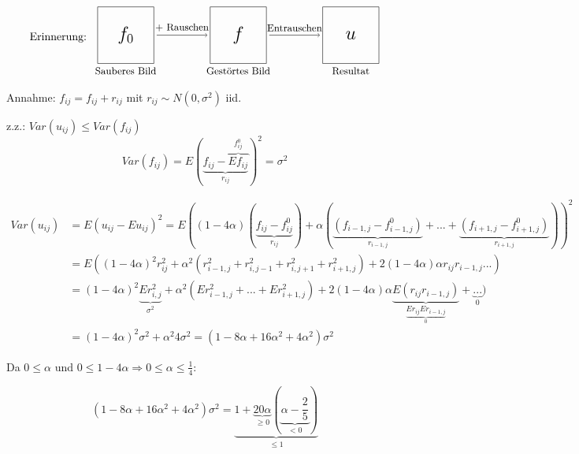 			\begin{equation*}
					\text{Erinnerung: } \raisebox{-1.2cm}{\begin{tikzpicture}[scale=0.9]
						\draw (0,0) rectangle (2,2);
						\draw (1,0) node[below] {\small Sauberes Bild};
						\draw (1,1) node[] {\LARGE $f_0$};
						\draw[->] (2.1,1) -- node[above] {\small $+$ Rauschen} (3.9,1);
						\draw (4,0) rectangle (6,2);
						\draw (5,0) node[below] {\small Gestörtes Bild};
						\draw (5,1) node[] {\LARGE $f$};
						\draw[->] (6.1,1) -- node[above] {\small Entrauschen} (7.9,1);
						\draw (8,0) rectangle (10,2);				
						\draw (9,0) node[below] {\small Resultat};
						\draw (9,1) node[] {\LARGE $u$};
					\end{tikzpicture}}
			\end{equation*}
		
			Annahme: $f_{ij} = f_{ij} +r_{ij}$ mit $r_{ij} \sim N(0,\sigma^2)$ iid.
		
			z.z.: $Var(u_{ij}) \leq Var(f_{ij})$\\
			
			\begin{equation*}
				Var(f_{ij}) = E(\underbrace{f_{ij} - \overbrace{E f_{ij}}^{f^0_{ij}}}%
					_{r_{ij}})^2 = \sigma^2
			\end{equation*}
		
			\todoLayout
			\begin{align*}
				Var(u_{ij}) &= E(u_{ij} - E u_{ij})^2 = E((1 - 4 \alpha) (\underbrace{f_{ij} - f^0_{ij}}_{r_{ij}}) + \alpha(\underbrace{(f_{i-1,j} - f^0_{i-1,j})}_{r_{i-1,j}} + ... + \underbrace{(f_{i+1,j} - f^0_{i+1,j})}_{r_{i+1,j}}))^2\\
				&= E((1 - 4 \alpha)^2 r_{ij}^2 + \alpha^2(r_{i-1,j}^2 + r_{i,j-1}^2 +r_{i,j+1}^2 + r_{i+1,j}^2) + 2 (1 - 4 \alpha) \alpha r_{ij} r_{i-1,j}...)\\
				&= (1 - 4 \alpha)^2 \underbrace{E r_{i,j}^2}_{\sigma^2} + \alpha^2(E r_{i-1,j}^2 + ... + E r_{i+1,j}^2) + 2 (1 - 4 \alpha) \alpha \underbrace{E(r_{ij}r_{i-1,j})}_{\underbrace{E r_{ij} E r_{i-1,j}}_{0}} + \underbrace{...}_{0})\\
				&=(1 - 4 \alpha)^2 \sigma^2 + \alpha^2 4 \sigma^2 = (1 - 8 \alpha + 16 \alpha ^2 + 4 \alpha^2) \sigma^2
			\end{align*}
		
			Da $0 \leq \alpha$ und $ 0 \leq 1 - 4 \alpha \Rightarrow 0 \leq \alpha \leq \frac{1}{4}$:
		
			\begin{equation*}
				(1 - 8 \alpha + 16 \alpha ^2 + 4 \alpha^2) \sigma^2 = \underbrace{1 + \underbrace{20 \alpha}_{\geq 0} (\underbrace{\alpha - \frac{2}{5}}_{< 0})}_{\leq 1}
			\end{equation*}
		
